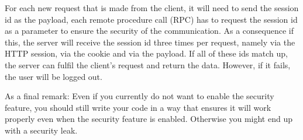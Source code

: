 For each new request that is made from the client, it will need to send the session id as the payload, \ie each remote procedure call (RPC) has to request the session id as a parameter to ensure the security of the communication. As a consequence if this, the server will receive the session id three times per request, namely via the HTTP session, via the cookie and via the payload. If all of these ids match up, the server can fulfil the client's request and return the data. However, if it fails, the user will be logged out.

As a final remark: Even if you currently do not want to enable the security feature, you should still write your code in a way that ensures it will work properly even when the security feature is enabled. Otherwise you might end up with a security leak.